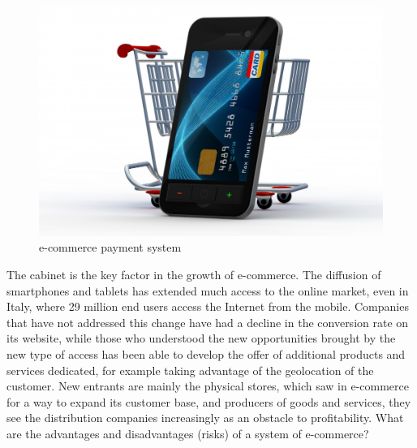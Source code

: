 \begin{figure}[htb]
 \centering
 \includegraphics[width=1.0\linewidth]{images/chapter1/mobile-e-commerce.jpg}\hfill
 \caption[e-commerce payment system]{e-commerce payment system}
 \label{fig:e_commerce_mobile_system}
\end{figure}
The cabinet is the key factor in the growth of e-commerce. The diffusion of smartphones and tablets has extended much access to the online market, even in Italy, where 29 million end users access the Internet from the mobile. Companies that have not addressed this change have had a decline in the conversion rate on its website, while those who understood the new opportunities brought by the new type of access has been able to develop the offer of additional products and services dedicated, for example taking advantage of the geolocation of the customer. New entrants are mainly the physical stores, which saw in e-commerce for a way to expand its customer base, and producers of goods and services, they see the distribution companies increasingly as an obstacle to profitability.
What are the advantages and disadvantages (risks) of a system of e-commerce?
\newline
